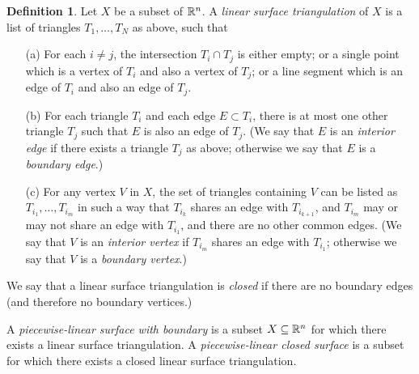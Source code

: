 \documentclass[reqno]{amsart}
\theoremstyle{definition}
\newtheorem{definition}[theorem]{Definition}
\begin{document}
\begin{definition}\label{defn-triangulation}
 Let $X$ be a subset of $\mathbb{R}^n$.  A \emph{linear surface triangulation}
 of $X$ is a list of triangles $T_1,\dotsc,T_N$ as above, such that
 \begin{itemize}
  \item[(a)] For each $i\neq j$, the intersection $T_i\cap T_j$ is either 
   empty; or a single point which is a vertex of $T_i$ and also a
   vertex of $T_j$; or a line segment which is an edge of $T_i$ and
   also an edge of $T_j$.
  \item[(b)] For each triangle $T_i$ and each edge $E\subset T_i$, there is
   at most one other triangle $T_j$ such that $E$ is also an edge of
   $T_j$.  (We say that $E$ is an \emph{interior edge} if there exists
   a triangle $T_j$ as above; otherwise we say that $E$ is a
   \emph{boundary edge}.)
  \item[(c)] For any vertex $V$ in $X$, the set of triangles containing
   $V$ can be listed as $T_{i_1},\dotsc,T_{i_m}$ in such a way
   that $T_{i_k}$ shares an edge with $T_{i_{k+1}}$, and $T_{i_m}$
   may or may not share an edge with $T_{i_1}$, and there are no other
   common edges.  (We say that $V$ is an \emph{interior vertex} if
   $T_{i_m}$ shares an edge with $T_{i_1}$; otherwise we say that $V$
   is a \emph{boundary vertex}.)
 \end{itemize}
 We say that a linear surface triangulation is \emph{closed} if there
 are no boundary edges (and therefore no boundary vertices.)

 A \emph{piecewise-linear surface with boundary} is a subset
 $X\subseteq\mathbb{R}^n$ for which there exists a linear surface triangulation.  A
 \emph{piecewise-linear closed surface} is a subset for which there
 exists a closed linear surface triangulation.
\end{definition}
\end{document}
